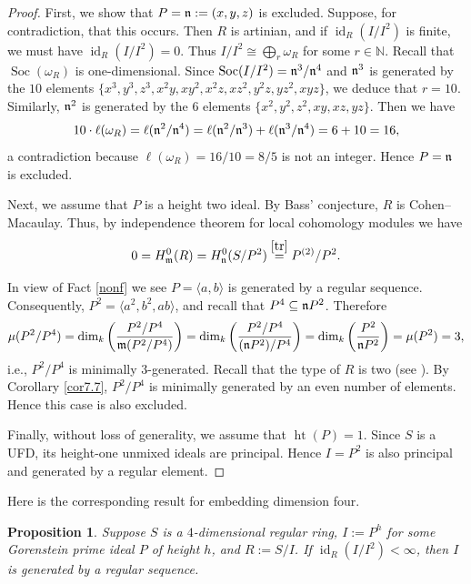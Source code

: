 \documentclass[10. pt,a4paper]{amsart}
\newtheorem{proposition}[theorem]{Proposition}
\theoremstyle{definition}
\theoremstyle{remark}
\newcommand{\id}{\operatorname{id}}
\newcommand{\fm}{\frak{m}}
\newcommand{\fn}{\frak{n}}
\begin{document}
\begin{proof}
	First, we show that $P = \fn := (x,y,z)$ is excluded. Suppose, for contradiction, that this occurs. Then $R$ is artinian, and if $\id_R(I/I^2)$ is finite, we must have $\id_R(I/I^2) = 0$. Thus $I/I^2 \cong \bigoplus_r \omega_R$ for some $r \in \mathbb{N}$. Recall that $\operatorname{Soc}(\omega_R)$ is one-dimensional. Since $\operatorname{Soc}(I/I^2) = \fn^3 / \fn^4$ and $\fn^3$ is generated by the $10$ elements $\{x^3, y^3, z^3, x^2y, xy^2, x^2z, xz^2, y^2z, yz^2, xyz\}$, we deduce that $r = 10$. Similarly, $\fn^2$ is generated by the $6$ elements $\{x^2, y^2, z^2, xy, xz, yz\}$. Then we have
	\[
	10 \cdot \ell(\omega_R) = \ell(\fn^2 / \fn^4) = \ell(\fn^2 / \fn^3) + \ell(\fn^3 / \fn^4) = 6 + 10 = 16,
	\]
	a contradiction because $\ell(\omega_R) = 16/10 = 8/5$ is not an integer. Hence $P = \fn$ is excluded.
	
	Next, we assume that $P$ is a height two ideal. By Bass' conjecture, $R$ is Cohen--Macaulay. Thus, by independence theorem for local cohomology modules we have 
	\[
	0 = H^0_{\fm}(R) = H^0_{\fn}(S/P^2) \stackrel{\ref{tr}}{=} P^{(2)} / P^2.
	\]
	
In view of {Fact} \ref{nonf} we see $P = \langle a, b \rangle$ is generated by a regular sequence. Consequently, $P^2 = \langle a^2, b^2, ab \rangle$, and recall that $P^4 \subseteq \fn P^2$. Therefore
	\[
	\mu(P^2 / P^4) = \dim_k\left(\frac{P^2 / P^4}{\fm (P^2 / P^4)}\right) = \dim_k\left(\frac{P^2 / P^4}{(\fn P^2)/ P^4}\right) = \dim_k\left(\frac{P^2}{\fn P^2}\right) = \mu(P^2) = 3,
	\]
	i.e., $P^2 / P^4$ is minimally $3$-generated. Recall that the type of $R$ is two (see \cite[6.6(ii)]{ini}). By Corollary \ref{cor7.7}, $P^2 / P^4$ is minimally generated by an even number of elements. Hence this case is also excluded.
	
	Finally, without loss of generality, we assume that $\operatorname{ht}(P) = 1$. Since $S$ is a UFD, its height-one unmixed ideals are principal. Hence $I = P^2$ is also principal and generated by a regular element.
\end{proof}

Here is the corresponding result for embedding dimension four.

\begin{proposition}\label{6.2d}
	Suppose $S$ is a $4$-dimensional regular ring, $I := P^h$ for some Gorenstein prime ideal $P$ of height $h$, and $R := S/I$. If $\id_R(I/I^2) < \infty$, then $I$ is   generated by a regular sequence.
\end{proposition}
\end{document}

